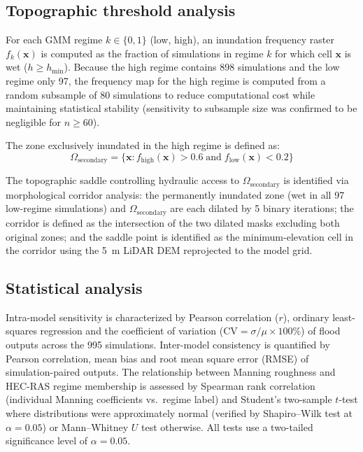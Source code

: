 \documentclass[review,12pt]{elsarticle}
\newcommand{\CV}{\text{CV}}
\newcommand{\hecras}{\textsc{HEC-RAS}}
\begin{document}
\subsection{Topographic threshold analysis}
\label{sec:topo_method}

For each GMM regime $k \in \{0, 1\}$ (low, high), an inundation frequency
raster $f_k(\mathbf{x})$ is computed as the fraction of simulations in
regime $k$ for which cell $\mathbf{x}$ is wet ($h \geq h_{\min}$).
Because the high regime contains 898 simulations and the low regime only 97,
the frequency map for the high regime is computed from a random subsample of
80 simulations to reduce computational cost while maintaining statistical
stability (sensitivity to subsample size was confirmed to be negligible for
$n \geq 60$).

The zone exclusively inundated in the high regime is defined as:
\begin{equation}
  \Omega_{\mathrm{secondary}} = \{{\mathbf{x}} : f_{\mathrm{high}}({\mathbf{x}}) > 0.6
  \;\mathrm{and}\; f_{\mathrm{low}}({\mathbf{x}}) < 0.2\}
  \label{eq:omega}
\end{equation}

The topographic saddle controlling hydraulic access to
$\Omega_{\mathrm{secondary}}$ is identified via morphological corridor
analysis: the permanently inundated zone (wet in all 97 low-regime
simulations) and $\Omega_{\mathrm{secondary}}$ are each dilated by 5 binary
iterations; the corridor is defined as the intersection of the two dilated
masks excluding both original zones; and the saddle point is identified as the
minimum-elevation cell in the corridor using the 5~m LiDAR DEM reprojected
to the model grid.

\subsection{Statistical analysis}
\label{sec:stats}

Intra-model sensitivity is characterized by Pearson correlation ($r$),
ordinary least-squares regression and the coefficient of variation
($\CV = \sigma/\mu \times 100$\%) of flood outputs across the 995
simulations.
Inter-model consistency is quantified by Pearson correlation, mean bias
and root mean square error (RMSE) of simulation-paired outputs.
The relationship between Manning roughness and \hecras{} regime membership
is assessed by Spearman rank correlation (individual Manning coefficients vs.\
regime label) and Student's two-sample $t$-test where distributions were
approximately normal (verified by Shapiro--Wilk test at $\alpha = 0.05$)
or Mann--Whitney $U$ test otherwise.
All tests use a two-tailed significance level of $\alpha = 0.05$.
\end{document}
